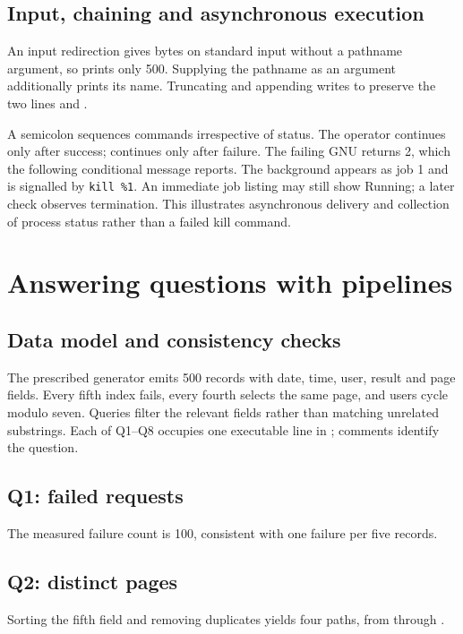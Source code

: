 \documentclass{../latex/utmreport}
\begin{document}
\section{Input, chaining and asynchronous execution}
An input redirection gives  bytes on standard input without a pathname
argument, so  prints only 500. Supplying the pathname as
an argument additionally prints its name. Truncating and appending writes to
 preserve the two lines  and .

A semicolon sequences commands irrespective of status. The \code{&&} operator
continues only after success; \code{||} continues only after failure. The failing
GNU  returns 2, which the following conditional message reports.
The background  appears as job 1 and is signalled by
\lstinline!kill %1!. An immediate job listing may still show Running; a later check
observes termination. This illustrates asynchronous delivery and collection of
process status rather than a failed kill command.

\chapter{Answering questions with pipelines}
\section{Data model and consistency checks}
The prescribed generator emits 500 records with date, time, user, result and page
fields. Every fifth index fails, every fourth selects the same page, and users
cycle modulo seven. Queries filter the relevant fields rather than matching
unrelated substrings. Each of Q1--Q8 occupies one executable line in
; comments identify the question.

\section{Q1: failed requests}
The measured failure count is 100, consistent with one failure per five records.
\section{Q2: distinct pages}
Sorting the fifth field and removing duplicates yields four paths, from
 through .
\end{document}
